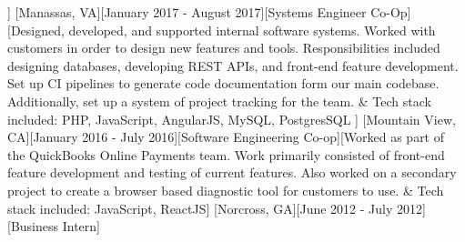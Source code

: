 \documentclass[showluaboxes=false]{resume}
\begin{document}
%
		]%
		[Manassas, VA][January 2017 - August 2017][Systems Engineer Co-Op][Designed, developed, and supported internal software systems. Worked with customers in order to design new features and tools. Responsibilities included designing databases, developing REST APIs, and front-end feature development. Set up CI pipelines to generate code documentation form our main codebase. Additionally, set up a system of project tracking for the team.%
		&%
		Tech stack included: PHP, JavaScript, AngularJS, MySQL, PostgresSQL
		]%
%
		[Mountain View, CA][January 2016 - July 2016][Software Engineering Co-op][Worked as part of the QuickBooks Online Payments team. Work primarily consisted of front-end feature development and testing of current features. Also worked on a secondary project to create a browser based diagnostic tool for customers to use.%
		&%
		Tech stack included: JavaScript, ReactJS]%
		[Norcross, GA][June 2012 - July 2012][Business Intern]%
\end{document}
